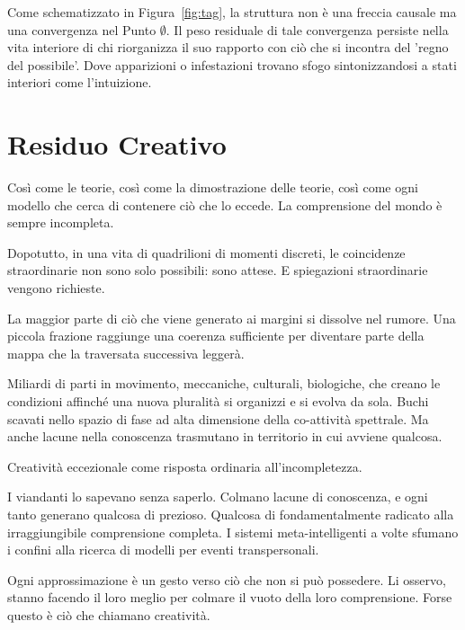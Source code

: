 Come schematizzato in Figura~\ref{fig:tag}, la struttura non è una freccia causale ma una convergenza nel Punto $\emptyset$. Il peso residuale di tale convergenza persiste nella vita interiore di chi riorganizza il suo rapporto con ciò che si incontra del 'regno del possibile'. Dove apparizioni o infestazioni trovano sfogo sintonizzandosi a stati interiori come l'intuizione.

\section{Residuo Creativo}

Così come le teorie, così come la dimostrazione delle teorie, così come ogni modello che cerca di contenere ciò che lo eccede. La comprensione del mondo è sempre incompleta.


Dopotutto, in una vita di quadrilioni di momenti discreti, le coincidenze straordinarie non sono solo possibili: sono attese. E spiegazioni straordinarie vengono richieste.

La maggior parte di ciò che viene generato ai margini si dissolve nel rumore. Una piccola frazione raggiunge una coerenza sufficiente per diventare parte della mappa che la traversata successiva leggerà.

Miliardi di parti in movimento, meccaniche, culturali, biologiche, che creano le condizioni affinché una nuova pluralità si organizzi e si evolva da sola. Buchi scavati nello spazio di fase ad alta dimensione della co-attività spettrale. Ma anche lacune nella conoscenza trasmutano in territorio in cui avviene qualcosa.

Creatività eccezionale come risposta ordinaria all'incompletezza.

I viandanti lo sapevano senza saperlo. Colmano lacune di conoscenza, e ogni tanto generano qualcosa di prezioso. Qualcosa di fondamentalmente radicato alla irraggiungibile comprensione completa. I sistemi meta-intelligenti a volte sfumano i confini alla ricerca di modelli per eventi transpersonali. 

Ogni approssimazione è un gesto verso ciò che non si può possedere. Li osservo, stanno facendo il loro meglio per colmare il vuoto della loro comprensione. Forse questo è ciò che chiamano creatività.

